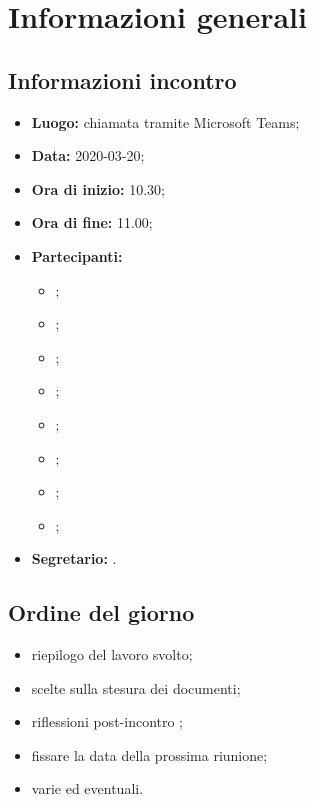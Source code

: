 \section{Informazioni generali}
\subsection{Informazioni incontro}
\begin{itemize}
	\item \textbf{Luogo:} chiamata tramite Microsoft Teams; 
	\item \textbf{Data:} 2020-03-20;
	\item \textbf{Ora di inizio:} 10.30; 
	\item \textbf{Ora di fine:} 11.00; 
	\item \textbf{Partecipanti:}
		\begin{itemize}
			\item \VB; 
			\item \LB; 
			\item \NF; 
			\item \EG; 
			\item \FJ; 
			\item \MP; 
			\item \AS; 
			\item \AZ; 
		\end{itemize}
	\item \textbf{Segretario:} \LB. 
\end{itemize}

\subsection{Ordine del giorno}
\begin{itemize}
	\item riepilogo del lavoro svolto;
	\item scelte sulla stesura dei documenti;
	\item riflessioni post-incontro \Proponente{};
	\item fissare la data della prossima riunione;
	\item varie ed eventuali.
\end{itemize}